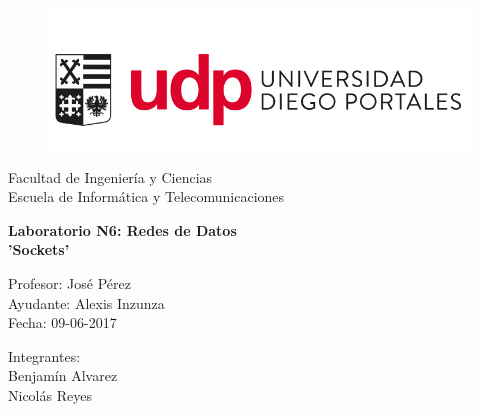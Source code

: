 \documentclass[onecolumn,11pts]{IEEEtran}
\date{Junio 2017}
\begin{document}
\begin{titlepage}

\begin{center}
\vspace*{-1in}
\begin{figure}[htb]
\begin{center}
\includegraphics[scale=0.4]{logo_udp}
\end{center}
\end{figure}
Facultad de Ingeniería y Ciencias\\Escuela de Informática y Telecomunicaciones\\
\vspace*{0.15in}
\vspace*{1in}

\begin{LARGE}
\textbf{Laboratorio N6: Redes de Datos\\
'Sockets'} \\
\end{LARGE}
\vspace*{1in}
\begin{large}
Profesor: José Pérez \\Ayudante: Alexis Inzunza \\ Fecha: 09-06-2017
\end{large}
\vspace*{0.3in}
\vspace*{1in}
\begin{large}
\begin{flushright}

Integrantes: \\
Benjamín Alvarez \\ Nicolás Reyes \\ 
\end{flushright}
\end{large}
\end{center}
\end{titlepage}


\tableofcontents %

\cleardoublepage
\end{document}
